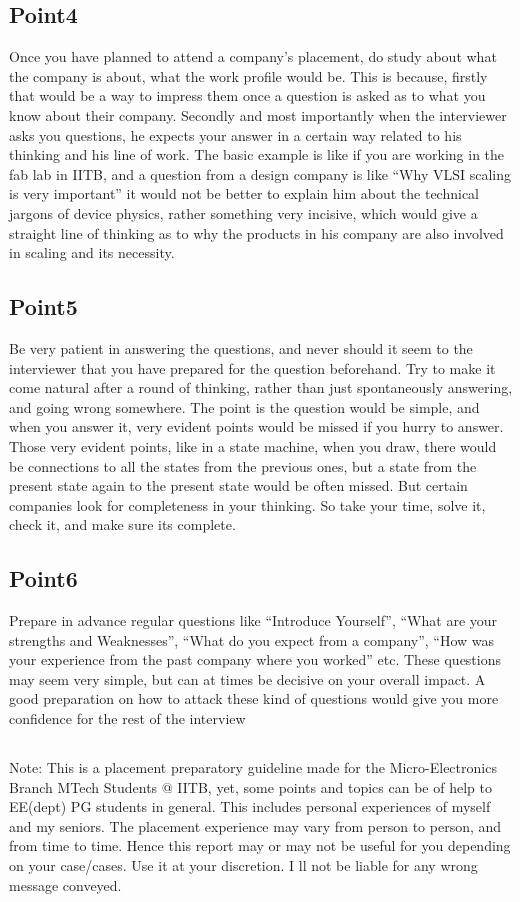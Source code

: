 \documentclass[a4paper,10pt]{article}
\begin{document}
\subsection*{Point4} 
Once you have planned to attend a company's placement, do study about what the company is about, what the work profile would be. This is because, firstly that would be a way to impress them once a question is asked
as to what you know about their company. Secondly and most importantly when the interviewer asks you questions, he expects your answer in a certain way related to his thinking and  his line of work. The basic example
is like if you are working in the fab lab in IITB, and a question from a design company is like “Why VLSI scaling is very important” it would not be better to explain him about the technical jargons of device physics,
rather something very incisive, which would give a straight line of thinking as to why the products in his company are also involved in scaling and its necessity.

\subsection*{Point5} Be very patient in answering the questions, and never should it seem to the interviewer that you have prepared for the question beforehand. Try to make it come natural after a round of thinking, 
rather than just spontaneously answering, and going wrong somewhere. The point is the question would be  simple, and when you answer it, very evident points would be missed if you hurry to answer. Those very evident points, 
like in a state machine, when you draw, there would be connections to all the states from the previous ones, but a state from the present state again to the present state would be often missed. But certain companies look for completeness in your thinking. So take your time, solve it, check it, and make sure its complete.

\subsection*{Point6} Prepare in advance regular questions like “Introduce Yourself”, “What are your strengths and Weaknesses”, “What do you expect from a company”, “How was your experience from the past company where you worked” etc. 
These questions may seem very simple, but can at times be decisive on your overall impact. A good preparation on how to attack these kind of questions would give you more confidence for the rest of the interview
 
\fontsize{8pt}{8pt}\selectfont
\subsection*{}
 Note:   This is a placement preparatory guideline made for the Micro-Electronics Branch MTech Students @ IITB, yet, some points and topics can be of help to EE(dept) PG students in general.
 This includes personal experiences of myself and my seniors. The placement experience may vary from person to person, and from time to time. Hence this report may or may not be useful for you 
 depending on your case/cases. Use it at your discretion. I ll not be liable for any wrong message conveyed. 
\end{document}
